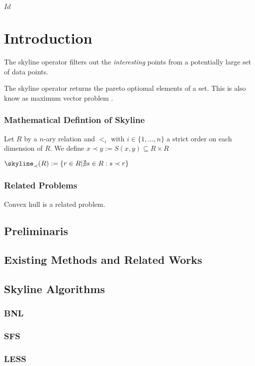 
\svnInfo $Id$

\chapter{Introduction\revision}
\label{chap:Introduction}


The skyline operator \citep{Borzsonyi2001} filters out the \emph{interesting} points from a potentially large set of data points.


The skyline operator returns the pareto optiomal elements of a set. This is also know as maximum vector problem \citep{Borzsonyi2001}.


\subsection{Mathematical Defintion of Skyline}

Let $R$ by a $n$-ary relation and $<_i$ with $i \in \{1, \ldots, n\}$
a strict order on each dimension of $R$.
We define $x \prec y := S(x, y) \subseteq R \times R$

$\skyline_\prec(R) := \{ r \in R | \nexists s \in R : s \prec r \}$

\subsection{Related Problems}
Convex hull is a related problem.


\section{Preliminaris}
\section{Existing Methods and Related Works}
\section{Skyline Algorithms}
\subsection{BNL}
\subsection{SFS}
\subsection{LESS}

